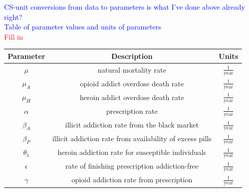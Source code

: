 \documentclass[12pt]{article}
\begin{document}
\pagebreak
\textcolor{blue}{CS-unit conversions from data to parameters is what I've done above already right?} \\

\textcolor{blue}{Table of parameter values and units of parameters} \\
\textcolor{red}{Fill in}


\begin{center}
 \setlength\extrarowheight{6pt}
\begin{tabular}{|c | c | c | }

 \hline

{Parameter} & {Description} & {Units} \\ [0.5ex]

 \hline\hline
 
 $\mu$ &  natural mortality rate & $\frac{1}{\text{year}}$ \\

 \hline

 $\mu_A$ & opioid addict overdose death rate & $\frac{1}{\text{year}}$\\

 \hline
 
 $\mu_H$ &  heroin addict overdose death rate & $\frac{1}{\text{year}}$ \\

 \hline

$\alpha$ &  prescription rate & $\frac{1}{\text{year}}$    \\

 \hline

$\beta_A$ & illicit addiction rate from the black market & $\frac{1}{\text{year}}$  \\

\hline

$\beta_P$ &  illicit addiction rate from availability of excess pills & $\frac{1}{\text{year}}$  \\

\hline

$\theta_1$&  heroin addiction rate for susceptible individuals & $\frac{1}{\text{year}}$   \\

\hline

$\epsilon$ &  rate of finishing prescription addiction-free & $\frac{1}{\text{year}}$ \\

\hline

$\gamma$ &  opioid addiction rate from prescription & $\frac{1}{\text{year}}$ \\


\end{tabular}
\end{center}
\end{document}
